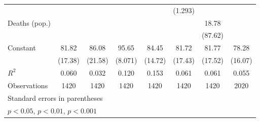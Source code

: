\documentclass{article}
\begin{document}
{\begin{longtable}{l*{7}{c}}
                &                  &                  &                  &                  &  (1.293)         &                  &                  \\
Deaths (pop.)   &                  &                  &                  &                  &                  &    18.78         &                  \\
                &                  &                  &                  &                  &                  &  (87.62)         &                  \\
Constant        &    81.82\sym{**} &    86.08\sym{**} &    95.65\sym{***}&    84.45\sym{***}&    81.72\sym{**} &    81.77\sym{**} &    78.28\sym{***}\\
                &  (17.38)         &  (21.58)         &  (8.071)         &  (14.72)         &  (17.43)         &  (17.52)         &  (16.07)         \\
\hline
\(R^{2}\)       &    0.060         &    0.032         &    0.120         &    0.153         &    0.061         &    0.061         &    0.055         \\
Observations    &     1420         &     1420         &     1420         &     1420         &     1420         &     1420         &     2020         \\
\hline\hline
\multicolumn{8}{l}{\footnotesize Standard errors in parentheses}\\
\multicolumn{8}{l}{\footnotesize \sym{*} \(p<0.05\), \sym{**} \(p<0.01\), \sym{***} \(p<0.001\)}\\
\end{longtable}
}
\end{document}
